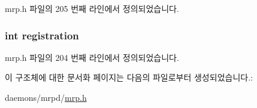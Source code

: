mrp.\+h 파일의 205 번째 라인에서 정의되었습니다.

\subsubsection[{\texorpdfstring{registration}{registration}}]{\setlength{\rightskip}{0pt plus 5cm}int registration}\hypertarget{structmrp__database_a76843f7fb36637f07903bdab30dd3658}{}\label{structmrp__database_a76843f7fb36637f07903bdab30dd3658}


mrp.\+h 파일의 204 번째 라인에서 정의되었습니다.



이 구조체에 대한 문서화 페이지는 다음의 파일로부터 생성되었습니다.\+:\begin{DoxyCompactItemize}
\item 
daemons/mrpd/\hyperlink{mrp_8h}{mrp.\+h}\end{DoxyCompactItemize}
